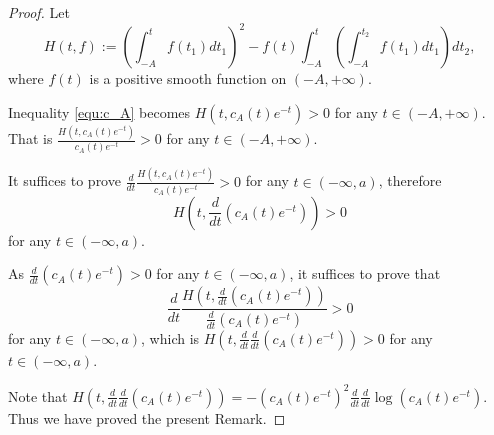 \begin{proof}
  Let
  \begin{equation}
    \label{eq:set_function}
    H(t,f):=\left(\int_{-A}^{t}f(t_{1})dt_{1}\right)^{2}-f(t)\int_{-A}^{t}\left(\int_{-A}^{t_{2}}f(t_{1})dt_{1}\right)dt_{2},
  \end{equation}
  where $f(t)$ is a positive smooth function on $(-A,+\infty)$.
  
  Inequality \ref{equ:c_A} becomes $H(t,c_{A}(t)e^{-t})>0$ for any $t\in(-A,+\infty)$.
  That is $\frac{H(t,c_{A}(t)e^{-t})}{c_{A}(t)e^{-t}}>0$ for any $t\in(-A,+\infty)$.
  
  It suffices to prove
  $\frac{d}{dt}\frac{H(t,c_{A}(t)e^{-t})}{c_{A}(t)e^{-t}}>0$ for any
  $t\in(-\infty,a)$, therefore $$H(t,\frac{d}{dt}(c_{A}(t)e^{-t}))>0$$
  for any $t\in(-\infty,a)$.
  
  As $\frac{d}{dt}(c_{A}(t)e^{-t})>0$ for any $t\in(-\infty,a)$, it suffices to prove that
  $$\frac{d}{dt}\frac{H(t,\frac{d}{dt}(c_{A}(t)e^{-t}))}{\frac{d}{dt}(c_{A}(t)e^{-t})}>0$$ for any $t\in(-\infty,a)$,
  which is $H(t,\frac{d}{dt}\frac{d}{dt}(c_{A}(t)e^{-t}))>0$ for any $t\in(-\infty,a)$.
  
  Note that $H(t,\frac{d}{dt}\frac{d}{dt}(c_{A}(t)e^{-t}))=
  -(c_{A}(t)e^{-t})^{2}\frac{d}{dt}\frac{d}{dt}\log(c_{A}(t)e^{-t})$.
  Thus we have proved the present Remark.
  \end{proof}

